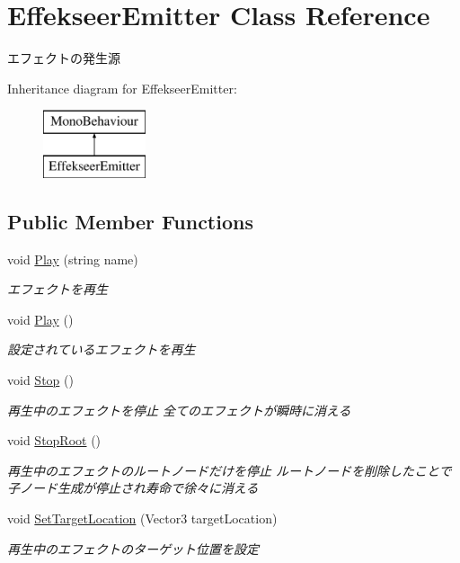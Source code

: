 \hypertarget{class_effekseer_emitter}{\section{Effekseer\-Emitter Class Reference}
\label{class_effekseer_emitter}
}


エフェクトの発生源  


Inheritance diagram for Effekseer\-Emitter\-:\begin{figure}[H]
\begin{center}
\leavevmode
\includegraphics[height=2.000000cm]{class_effekseer_emitter}
\end{center}
\end{figure}
\subsection*{Public Member Functions}
\begin{DoxyCompactItemize}
\item 
void \hyperlink{class_effekseer_emitter_a8ae6fd4f46274d56eee5de6b1de3ee9b}{Play} (string name)
\begin{DoxyCompactList}\small\item\em エフェクトを再生 \end{DoxyCompactList}\item 
void \hyperlink{class_effekseer_emitter_a55d07e8215485e43eaa94b7b075b2f04}{Play} ()
\begin{DoxyCompactList}\small\item\em 設定されているエフェクトを再生 \end{DoxyCompactList}\item 
void \hyperlink{class_effekseer_emitter_acab7d9ae949cd0aa844ae66b2f44ad5d}{Stop} ()
\begin{DoxyCompactList}\small\item\em 再生中のエフェクトを停止 全てのエフェクトが瞬時に消える \end{DoxyCompactList}\item 
void \hyperlink{class_effekseer_emitter_a6bb4daefa3632e823b684ba575043290}{Stop\-Root} ()
\begin{DoxyCompactList}\small\item\em 再生中のエフェクトのルートノードだけを停止 ルートノードを削除したことで子ノード生成が停止され寿命で徐々に消える \end{DoxyCompactList}\item 
void \hyperlink{class_effekseer_emitter_a39366319e460cc573d4bfc40803f6787}{Set\-Target\-Location} (Vector3 target\-Location)
\begin{DoxyCompactList}\small\item\em 再生中のエフェクトのターゲット位置を設定 \end{DoxyCompactList}\end{DoxyCompactItemize}
